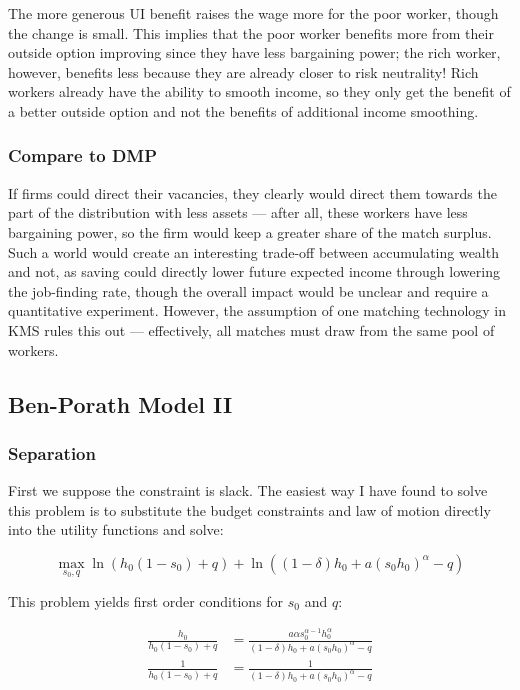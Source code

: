 \documentclass[12pt, letterpaper, parskip = full]{article}
\begin{document}
    The more generous UI benefit raises the wage more for the poor worker, though the change is small. This implies that the poor worker benefits more from their outside option improving since they have less bargaining power; the rich worker, however, benefits less because they are already closer to risk neutrality! Rich workers already have the ability to smooth income, so they only get the benefit of a better outside option and not the benefits of additional income smoothing.

    \subsubsection{Compare to DMP}

    If firms could direct their vacancies, they clearly would direct them towards the part of the distribution with less assets --- after all, these workers have less bargaining power, so the firm would keep a greater share of the match surplus. Such a world would create an interesting trade-off between accumulating wealth and not, as saving could directly lower future expected income through lowering the job-finding rate, though the overall impact would be unclear and require a quantitative experiment. However, the assumption of one matching technology in KMS rules this out --- effectively, all matches must draw from the same pool of workers. 

    \subsection{Ben-Porath Model II}

    \subsubsection{Separation}

    First we suppose the constraint is slack. The easiest way I have found to solve this problem is to substitute the budget constraints and law of motion directly into the utility functions and solve:

    \[ \max_{s_0, q} \ln\left(h_0(1-s_0) + q\right) + \ln\left((1-\delta) h_0 + a (s_0 h_0)^\alpha - q\right) \] 

    This problem yields first order conditions for \(s_0\) and \(q\):

    \begin{align*}
    \frac{h_0}{h_0 (1 - s_0) + q} &= \frac{a \alpha s_0^{\alpha - 1} h_0^\alpha}{(1-\delta) h_0 + a (s_0 h_0)^\alpha - q} \\
    \frac{1}{h_0 (1 - s_0) + q} &= \frac{1}{(1-\delta) h_0 + a (s_0 h_0)^\alpha - q}
    \end{align*}
\end{document}
